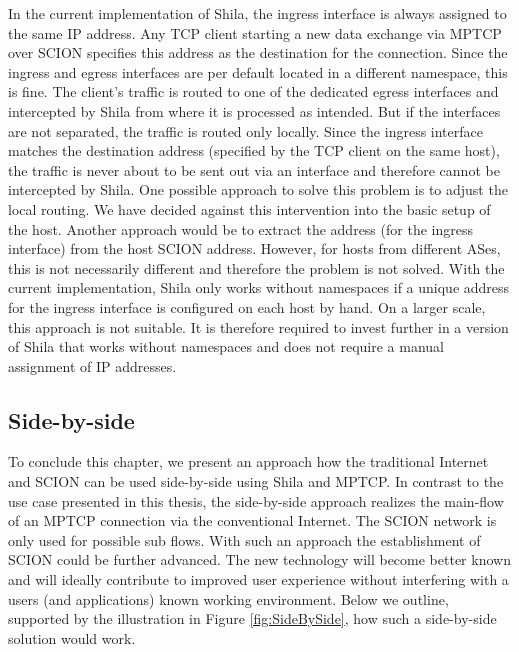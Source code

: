 In the current implementation of Shila, the ingress interface is always assigned to the same IP address. Any TCP client starting a new data exchange via MPTCP over SCION specifies this address as the destination for the connection. Since the ingress and egress interfaces are per default located in a different namespace, this is fine. The client's traffic is routed to one of the dedicated egress interfaces and intercepted by Shila from where it is processed as intended. But if the interfaces are not separated, the traffic is routed only locally. Since the ingress interface matches the destination address (specified by the TCP client on the same host), the traffic is never about to be sent out via an interface and therefore cannot be intercepted by Shila. One possible approach to solve this problem is to adjust the local routing. We have decided against this intervention into the basic setup of the host. Another approach would be to extract the address (for the ingress interface) from the host SCION address. However, for hosts from different ASes, this is not necessarily different and therefore the problem is not solved.  With the current implementation, Shila only works without namespaces if a unique address for the ingress interface is configured on each host by hand. On a larger scale, this approach is not suitable. It is therefore required to invest further in a version of Shila that works without namespaces and does not require a manual assignment of IP addresses.

\subsection*{Side-by-side}

To conclude this chapter, we present an approach how the traditional Internet and SCION can be used side-by-side using Shila and MPTCP. In contrast to the use case presented in this thesis, the side-by-side approach realizes the main-flow of an MPTCP connection via the conventional Internet. The SCION network is only used for possible sub flows. With such an approach the establishment of SCION could be further advanced. The new technology will become better known and will ideally contribute to improved user experience without interfering with a users (and applications) known working environment. Below we outline, supported by the illustration in Figure \ref{fig:SideBySide}, how such a side-by-side solution would work.

